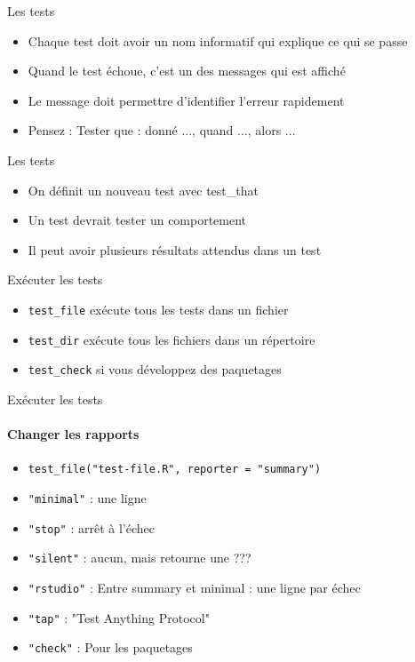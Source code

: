 \documentclass[11pt]{beamer}
\begin{document}
\begin{frame}{Les tests}
\begin{itemize}
\item Chaque test doit avoir un nom informatif qui explique ce qui se passe
\item Quand le test échoue, c'est un des messages qui est affiché
\item Le message doit permettre d'identifier l'erreur rapidement
\item Pensez : Tester que : donné ..., quand ..., alors ...
\end{itemize}
\end{frame}

\begin{frame}{Les tests}
\begin{itemize}
\item On définit un nouveau test avec test\_that
\item Un test devrait tester un comportement
\item Il peut avoir plusieurs résultats attendus dans un test
\end{itemize}
\end{frame}

\begin{frame}{Exécuter les tests}
\begin{itemize}
\item {\texttt{test\_file}} exécute tous les tests dans un fichier
\item {\texttt{test\_dir}} exécute tous les fichiers dans un répertoire
\item \texttt{test\_check} si vous développez des paquetages
\end{itemize}
\end{frame}

\begin{frame}{Exécuter les tests}
\framesubtitle{Changer les rapports}
\begin{itemize}
\item \texttt{test\_file("test-file.R", reporter = "summary")}
\item \texttt{"minimal"} : une ligne
\item \texttt{"stop"} : arrêt à l'échec
\item \texttt{"silent"} : aucun, mais retourne une ???
\item \texttt{"rstudio"} : Entre summary et minimal : une ligne par échec
\item \texttt{"tap"} : "Test Anything Protocol"
\item \texttt{"check"} : Pour les paquetages
\end{itemize}
\end{frame}
\end{document}
